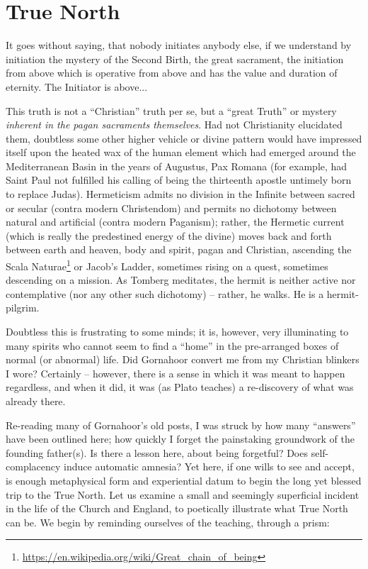 \section{True North}

\begin{quotex}
It goes without saying, that nobody initiates anybody else, if we understand by initiation the mystery of the Second Birth, the great sacrament, the initiation from above which is operative from above and has the value and duration of eternity. The Initiator is above...

\end{quotex}


This truth is not a ``Christian'' truth per se, but a ``great Truth'' or mystery \emph{inherent in the pagan sacraments themselves}. Had not Christianity elucidated them, doubtless some other higher vehicle or divine pattern would have impressed itself upon the heated wax of the human element which had emerged around the Mediterranean Basin in the years of Augustus, Pax Romana (for example, had Saint Paul not fulfilled his calling of being the thirteenth apostle untimely born to replace Judas). Hermeticism admits no division in the Infinite between sacred or secular (contra modern Christendom) and permits no dichotomy between natural and artificial (contra modern Paganism); rather, the Hermetic current (which is really the predestined energy of the divine) moves back and forth between earth and heaven, body and spirit, pagan and Christian, ascending the Scala Naturae\footnote{\url{https://en.wikipedia.org/wiki/Great\_chain\_of\_being}} or Jacob's Ladder, sometimes rising on a quest, sometimes descending on a mission. As Tomberg meditates, the hermit is neither active nor contemplative (nor any other such dichotomy) -- rather, he walks. He is a hermit-pilgrim.

Doubtless this is frustrating to some minds; it is, however, very illuminating to many spirits who cannot seem to find a ``home'' in the pre-arranged boxes of normal (or abnormal) life. Did Gornahoor convert me from my Christian blinkers I wore? Certainly -- however, there is a sense in which it was meant to happen regardless, and when it did, it was (as Plato teaches) a re-discovery of what was already there.

Re-reading many of Gornahoor's old posts, I was struck by how many ``answers'' have been outlined here; how quickly I forget the painstaking groundwork of the founding father(s). Is there a lesson here, about being forgetful? Does self-complacency induce automatic amnesia? Yet here, if one wills to see and accept, is enough metaphysical form and experiential datum to begin the long yet blessed trip to the True North. Let us examine a small and seemingly superficial incident in the life of the Church and England, to poetically illustrate what True North can be. We begin by reminding ourselves of the teaching, through a prism:

